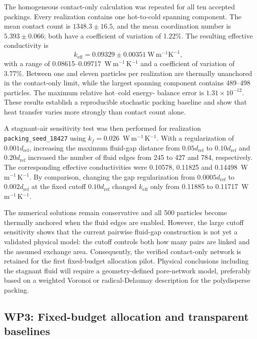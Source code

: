 \documentclass[12pt,a4paper]{article}
\begin{document}
The homogeneous contact-only calculation was repeated for all ten accepted
packings. Every realization contains one hot-to-cold spanning component. The
mean contact count is $1348.3\pm16.5$, and the mean coordination number is
$5.393\pm0.066$; both have a coefficient of variation of 1.22\%. The resulting
effective conductivity is
\begin{equation}
    k_{\mathrm{eff}}=0.09329\pm0.00351~\mathrm{W\,m^{-1}K^{-1}},
\end{equation}
with a range of 0.08615--0.09717~W\,m$^{-1}$\,K$^{-1}$ and a coefficient of
variation of 3.77\%. Between one and eleven particles per realization are
thermally unanchored in the contact-only limit, while the largest spanning
component contains 489--498 particles. The maximum relative hot--cold energy-
balance error is $1.31\times10^{-12}$. These results establish a reproducible
stochastic packing baseline and show that heat transfer varies more strongly
than contact count alone.

A stagnant-air sensitivity test was then performed for realization
\texttt{packing\_seed\_18427} using $k_f=0.026$~W\,m$^{-1}$\,K$^{-1}$. With a
regularization of $0.001d_{\mathrm{ref}}$, increasing the maximum fluid-gap
distance from $0.05d_{\mathrm{ref}}$ to $0.10d_{\mathrm{ref}}$ and
$0.20d_{\mathrm{ref}}$ increased the number of fluid edges from 245 to 427 and
784, respectively. The corresponding effective conductivities were 0.10578,
0.11825 and 0.14498~W\,m$^{-1}$\,K$^{-1}$. By comparison, changing the gap
regularization from $0.0005d_{\mathrm{ref}}$ to $0.002d_{\mathrm{ref}}$ at the
fixed cutoff $0.10d_{\mathrm{ref}}$ changed $k_{\mathrm{eff}}$ only from
0.11885 to 0.11717~W\,m$^{-1}$\,K$^{-1}$.

The numerical solutions remain conservative and all 500 particles become
thermally anchored when the fluid edges are enabled. However, the large cutoff
sensitivity shows that the current pairwise fluid-gap construction is not yet
a validated physical model: the cutoff controls both how many pairs are linked
and the assumed exchange area. Consequently, the verified contact-only network
is retained for the first fixed-budget allocation pilot. Physical conclusions
including the stagnant fluid will require a geometry-defined pore-network
model, preferably based on a weighted Voronoi or radical-Delaunay description
for the polydisperse packing.

\subsection*{WP3: Fixed-budget allocation and transparent baselines}
\end{document}
